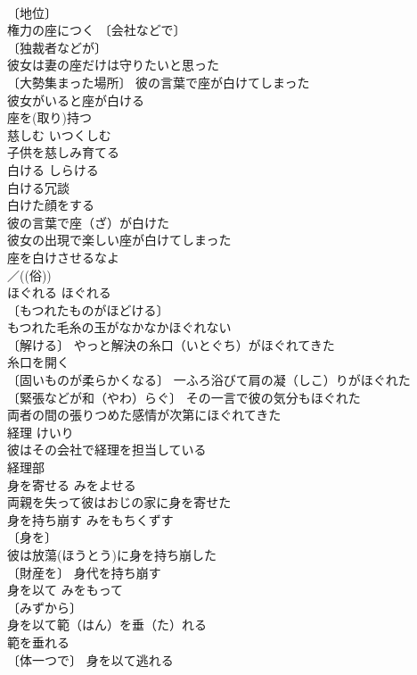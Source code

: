 \documentclass[8pt]{extreport}
\begin{document}
\begin{CJK}{UTF8}{min}
\\	〔地位〕
\\	権力の座につく 〔会社などで〕
\\	〔独裁者などが〕
\\	彼女は妻の座だけは守りたいと思った 
\\	〔大勢集まった場所〕 彼の言葉で座が白けてしまった 
\\	彼女がいると座が白ける 
\\	座を(取り)持つ 
\\	慈しむ	いつくしむ	
\\	子供を慈しみ育てる 
\\	白ける	しらける	
\\	白ける冗談 
\\	白けた顔をする 
\\	彼の言葉で座（ざ）が白けた 
\\	彼女の出現で楽しい座が白けてしまった 
\\	座を白けさせるなよ 
\\	／((俗))
\\	ほぐれる	ほぐれる	
\\	〔もつれたものがほどける〕
\\	もつれた毛糸の玉がなかなかほぐれない 
\\	〔解ける〕 やっと解決の糸口（いとぐち）がほぐれてきた 
\\	糸口を開く 
\\	〔固いものが柔らかくなる〕 一ふろ浴びて肩の凝（しこ）りがほぐれた 
\\	〔緊張などが和（やわ）らぐ〕 その一言で彼の気分もほぐれた 
\\	両者の間の張りつめた感情が次第にほぐれてきた 
\\	経理	けいり	
\\	彼はその会社で経理を担当している 
\\	経理部 
\\	身を寄せる	みをよせる	
\\	両親を失って彼はおじの家に身を寄せた 
\\	身を持ち崩す	みをもちくずす	
\\	〔身を〕
\\	彼は放蕩(ほうとう)に身を持ち崩した 
\\	〔財産を〕 身代を持ち崩す 
\\	身を以て	みをもって	
\\	〔みずから〕
\\	身を以て範（はん）を垂（た）れる 
\\	範を垂れる　
\\	〔体一つで〕 身を以て逃れる 

\end{CJK}
\end{document}
